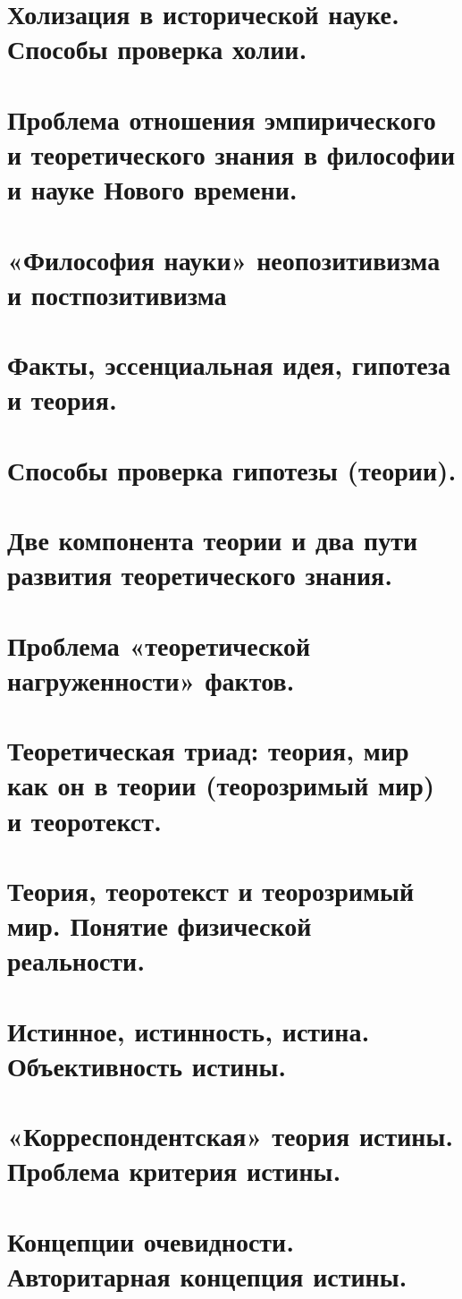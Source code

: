 \section{ Холизация в исторической науке. Способы проверка холии.}
\section{ Проблема отношения эмпирического и теоретического знания в философии и науке Нового времени.}
\section{ «Философия науки» неопозитивизма и постпозитивизма }
\section{ Факты, эссенциальная идея, гипотеза и теория.}
\section{ Способы проверка гипотезы (теории).}
\section{ Две компонента теории и два пути развития теоретического знания.}
\section{ Проблема «теоретической нагруженности» фактов.}
\section{ Теоретическая триад: теория, мир как он в теории (теорозримый мир) и теоротекст.}
\section{ Теория, теоротекст и теорозримый мир. Понятие физической реальности.}
\section{ Истинное, истинность, истина. Объективность истины.}
\section{ «Корреспондентская» теория истины. Проблема критерия истины.}
\section{ Концепции очевидности. Авторитарная концепция истины.}
